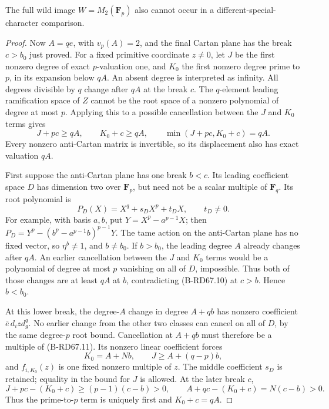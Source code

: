 \begin{lemma}
\label{lem:B-RD67-full-wild}
The full wild image \(W=M_2(\mathbf F_p)\) also cannot occur
in a different-special-character comparison.
\end{lemma}
\begin{proof}
Now \(A=qe\), with \(v_p(A)=2\), and the final Cartan plane
has the break \(c>b_0\) just proved. For a fixed primitive
coordinate \(z\ne0\), let \(J\) be the first nonzero degree
of exact \(p\)-valuation one, and \(K_0\) the first nonzero
degree prime to \(p\), in its expansion below \(qA\).
An absent degree is interpreted as infinity. All degrees
divisible by \(q\) change after \(qA\) at the break \(c\).
The \(q\)-element leading ramification space of \(Z\) cannot
be the root space of a nonzero polynomial of degree at most \(p\).
Applying this to a possible cancellation between the \(J\)
and \(K_0\) terms gives
\[
 J+pc\ge qA,\qquad K_0+c\ge qA,\qquad
 \min(J+pc,K_0+c)=qA .
 \tag{B-RD67.10}
\]
Every nonzero anti-Cartan matrix is invertible, so its displacement
also has exact valuation \(qA\).

First suppose the anti-Cartan plane has one break \(b<c\).
Its leading coefficient space \(D\) has dimension two over
\(\mathbf F_p\), but need not be a scalar multiple of \(\mathbf F_q\).
Its root polynomial is
\[
 P_D(X)=X^q+s_DX^p+t_DX,\qquad t_D\ne0.
 \tag{B-RD67.11}
\]
For example, with basis \(a,b\), put \(Y=X^p-a^{p-1}X\);
then \(P_D=Y^p-(b^p-a^{p-1}b)^{p-1}Y\).
The tame action on the anti-Cartan plane has no fixed vector,
so \(\eta^b\ne1\), and \(b\ne b_0\).
If \(b>b_0\), the leading degree \(A\) already changes after
\(qA\). An earlier cancellation between the \(J\) and \(K_0\)
terms would be a polynomial of degree at most \(p\) vanishing
on all of \(D\), impossible. Thus both of those changes are
at least \(qA\) at \(b\), contradicting (B-RD67.10) at \(c>b\).
Hence \(b<b_0\).

At this lower break, the degree-\(A\) change in degree \(A+qb\)
has nonzero coefficient \(\bar e\,d_i z d_g^q\).
No earlier change from the other two classes can cancel on
all of \(D\), by the same degree-\(p\) root bound.
Cancellation at \(A+qb\) must therefore be a multiple of
(B-RD67.11). Its nonzero linear coefficient forces
\[
 K_0=A+Nb,\qquad J\ge A+(q-p)b,
 \tag{B-RD67.12}
\]
and \(f_{i,K_0}(z)\) is one fixed nonzero multiple of \(z\).
The middle coefficient \(s_D\) is retained; equality in the
bound for \(J\) is allowed. At the later break \(c\),
\[
 J+pc-(K_0+c)\ge(p-1)(c-b)>0,\qquad
 A+qc-(K_0+c)=N(c-b)>0 .
 \tag{B-RD67.13}
\]
Thus the prime-to-\(p\) term is uniquely first and
\(K_0+c=qA\).


\end{proof}
